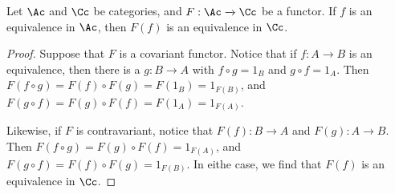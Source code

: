 \begin{theorem}\label{1.3.1}
    Let $\Ac$ and  $\Cc$ be categories, and $F:\Ac \xrightarrow{} \Cc$ be a
    functor. If $f$ is an equivalence in  $\Ac$, then  $F(f)$ is an equivalence
    in $\Cc$.
\end{theorem}
\begin{proof}
    Suppose that $F$ is a covariant functor. Notice that if  $f:A \xrightarrow{}
    B$ is an equivalence, then there is a $g:B \xrightarrow{} A$ with $f \circ
    g=1_B$ and  $g \circ f=1_A$. Then  $F(f \circ g)=F(f) \circ
    F(g)=F(1_B)=1_{F(B)}$, and $F(g \circ f)=F(g) \circ F(f)=F(1_A)=1_{F(A)}$.

    Likewise, if $F$ is contravariant, notice that  $F(f):B \xrightarrow{} A$
    and $F(g):A \xrightarrow{} B$. Then $F(f \circ g)=F(g) \circ F(f)=1_{F(A)}$,
    and $F(g \circ f)=F(f) \circ F(g)=1_{F(B)}$. In eithe case, we find that
    $F(f)$ is an equivalence in $\Cc$.
\end{proof}
